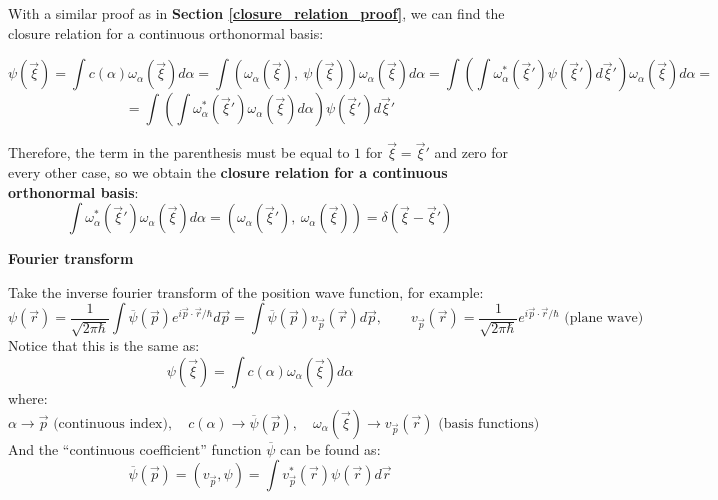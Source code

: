 With a similar proof as in \textbf{Section \ref{closure_relation_proof}}, we can find the closure relation for a continuous orthonormal basis:

\begin{equation*}
    \psi(\vec{\xi}) = \int c(\alpha) \omega_\alpha(\vec{\xi})d\alpha = \int \left(\omega_\alpha(\vec{\xi}), \ \psi(\vec{\xi})\right) \omega_\alpha(\vec{\xi})d\alpha = \int \left(\int \omega_\alpha^*(\vec{\xi}')\psi(\vec{\xi}')d\vec{\xi}'\right) \omega_\alpha(\vec{\xi})d\alpha  =    
\end{equation*}
\begin{equation}
    = \int \left(\int \omega_\alpha^*(\vec{\xi}')\omega_\alpha(\vec{\xi})d\alpha\right) \psi(\vec{\xi}')d\vec{\xi}'
\end{equation}

Therefore, the term in the parenthesis must be equal to $1$ for $\vec{\xi} =\vec{\xi}'$ and zero for every other case, so we obtain the \textbf{closure relation for a continuous orthonormal basis}:
\begin{equation}
    \int \omega_\alpha^*(\vec{\xi}')\omega_\alpha(\vec{\xi})d\alpha = \left( \omega_\alpha (\vec{\xi}'),\ \omega_\alpha (\vec{\xi}) \right) = \delta(\vec{\xi} - \vec{\xi}')
\end{equation}

\textbf{Fourier transform}

Take the inverse fourier transform of the position wave function, for example:
\begin{equation}
    \psi(\vec{r}) = \frac{1}{\sqrt{2\pi\hbar}}\int \overline\psi(\vec{p})e^{i\vec{p}\cdot \vec{r}/\hbar}d \vec{p} = \int \overline\psi(\vec{p})v_{\vec{p}}(\vec{r})d\vec{p}, \qquad v_{\vec{p}}(\vec{r}) = \frac{1}{\sqrt{2\pi\hbar}}e^{i\vec{p} \cdot\vec{r}/\hbar} \text{ (plane wave)}
\end{equation}
Notice that this is the same as:
\begin{equation}
    \psi(\vec{\xi}) = \int c(\alpha) \omega_\alpha(\vec{\xi})d\alpha
\end{equation}
where:
\begin{equation}
    \alpha \to \vec{p} \text{ (continuous index)}, \quad c(\alpha) \to \overline\psi(\vec{p}), \quad \omega_\alpha(\vec{\xi}) \to v_{\vec{p}}(\vec{r}) \text{ (basis functions)}
\end{equation}
And the ``continuous coefficient'' function $\overline\psi$ can be found as:
\begin{equation}
    \overline\psi(\vec{p}) = (v_{\vec{p}}, \psi) = \int v_{\vec{p}}^*(\vec{r})\psi(\vec{r})d\vec{r}
\end{equation}



